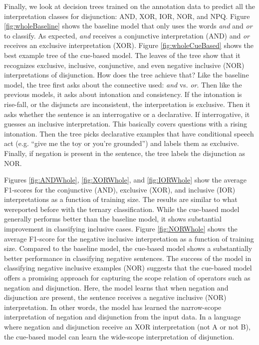 \documentclass[,man,floatsintext]{apa6}
\begin{document}
Finally, we look at decision trees trained on the annotation data to predict all the interpretation classes for disjunction: AND, XOR, IOR, NOR, and NPQ. Figure \ref{fig:wholeBaseline} shows the baseline model that only uses the words \emph{and} and \emph{or} to classify. As expected, \emph{and} receives a conjunctive interpretation (AND) and \emph{or} receives an exclusive interpretation (XOR). Figure \ref{fig:wholeCueBased} shows the best example tree of the cue-based model. The leaves of the tree show that it recognizes exclusive, inclusive, conjunctive, and even negative inclusive (NOR) interpretations of disjunction. How does the tree achieve that? Like the baseline model, the tree first asks about the connective used: \emph{and} vs. \emph{or}. Then like the previous models, it asks about intonation and consistency. If the intonation is rise-fall, or the disjuncts are inconsistent, the interpretation is exclusive. Then it asks whether the sentence is an interrogative or a declarative. If interrogative, it guesses an inclusive interpretation. This basically covers questions with a rising intonation. Then the tree picks declarative examples that have conditional speech act (e.g. \enquote{give me the toy or you're grounded}) and labels them as exclusive. Finally, if negation is present in the sentence, the tree labels the disjunction as NOR.

Figures \ref{fig:ANDWhole}, \ref{fig:XORWhole}, and \ref{fig:IORWhole} show the average F1-scores for the conjunctive (AND), exclusive (XOR), and inclusive (IOR) interpretations as a function of training size. The results are similar to what wereported before with the ternary classification. While the cue-based model generally performs better than the baseline model, it shows substantial improvement in classifying inclusive cases. Figure \ref{fig:NORWhole} shows the average F1-score for the negative inclusive interpretation as a function of training size. Compared to the baseline model, the cue-based model shows a substantially better performance in classifying negative sentences. The success of the model in classifying negative inclusive examples (NOR) suggests that the cue-based model offers a promising approach for capturing the scope relation of operators such as negation and disjunction. Here, the model learns that when negation and disjunction are present, the sentence receives a negative inclusive (NOR) interpretation. In other words, the model has learned the narrow-scope interpretation of negation and disjunction from the input data. In a language where negation and disjunction receive an XOR interpretation (not A or not B), the cue-based model can learn the wide-scope interpretation of disjunction.
\end{document}
